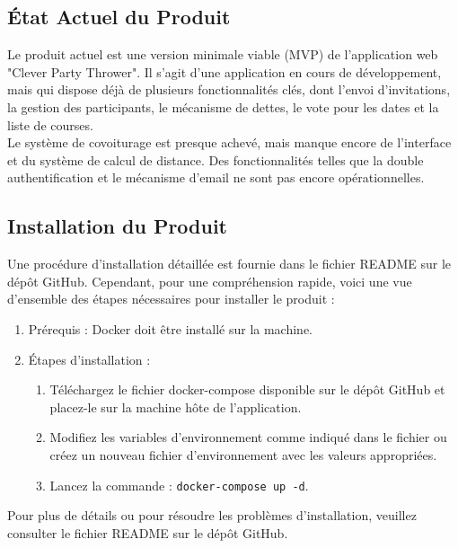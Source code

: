 \subsection{État Actuel du Produit}\label{subsec:etat-actuel-du-produit}

Le produit actuel est une version minimale viable (MVP) de l'application web "Clever Party Thrower".
Il s'agit d'une application en cours de développement, mais qui dispose déjà de plusieurs fonctionnalités clés, dont l'envoi d'invitations,
la gestion des participants, le mécanisme de dettes, le vote pour les dates et la liste de courses.\\

Le système de covoiturage est presque achevé, mais manque encore de l'interface et du système de calcul de distance.
Des fonctionnalités telles que la double authentification et le mécanisme d'email ne sont pas encore opérationnelles.

\subsection{Installation du Produit}\label{subsec:installation-du-produit}

Une procédure d'installation détaillée est fournie dans le fichier README sur le dépôt GitHub.
Cependant, pour une compréhension rapide,
voici une vue d'ensemble des étapes nécessaires pour installer le produit :

\begin{enumerate}
    \item Prérequis : Docker doit être installé sur la machine.
    \item Étapes d'installation :
    \begin{enumerate}
        \item Téléchargez le fichier docker-compose disponible sur le dépôt GitHub et placez-le sur la machine hôte de l'application.
        \item Modifiez les variables d'environnement comme indiqué dans le fichier ou créez un nouveau fichier d'environnement avec les valeurs appropriées.
        \item Lancez la commande : \texttt{docker-compose up -d}.
    \end{enumerate}
\end{enumerate}

Pour plus de détails ou pour résoudre les problèmes d'installation, veuillez consulter le fichier README sur le dépôt GitHub.

